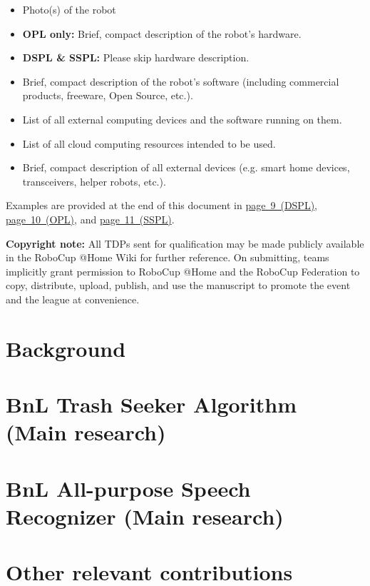 \documentclass[runningheads,a4paper]{llncs}
\begin{document}
\begin{itemize}
	\item Photo(s) of the robot
	\item \textbf{OPL only:} Brief, compact description of the robot's hardware.
	\item \textbf{DSPL \& SSPL:} Please skip hardware description.
	\item Brief, compact description of the robot's software (including commercial products, freeware, Open Source, etc.).
	\item List of all external computing devices and the software running on them.
	\item List of all cloud computing resources intended to be used.
	\item Brief, compact description of all external devices (e.g. smart home devices, transceivers, helper robots, etc.).
\end{itemize}

Examples are provided at the end of this document in
\hyperlink{page.9}{page~9~(DSPL)},
\hyperlink{page.10}{page~10~(OPL)}, and
\hyperlink{page.11}{page~11~(SSPL)}.

\textbf{Copyright note:} All TDPs sent for qualification may be made publicly available in the RoboCup @Home Wiki for further reference. On submitting, teams implicitly grant permission to RoboCup @Home and the RoboCup Federation to copy, distribute, upload, publish, and use the manuscript to promote the event and the league at convenience.

\section{Background}
\lipsum[1-3]

\section{BnL Trash Seeker Algorithm (Main research)}
\lipsum[4-10]

\section{BnL All-purpose Speech Recognizer (Main research)}
\lipsum[11-13]

\section{Other relevant contributions}
\lipsum[14]
\end{document}
